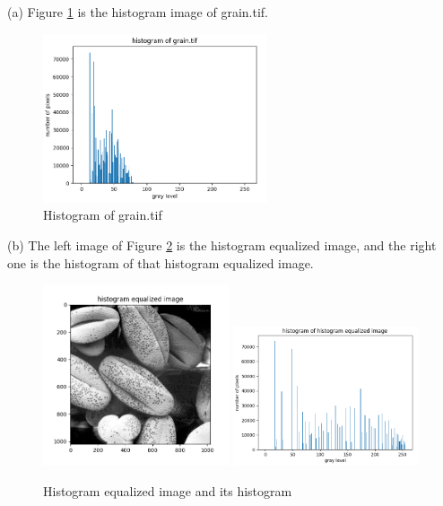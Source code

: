 \problem{}
(a) Figure \ref{fig:p1a} is the histogram image of grain.tif.\\

\begin{figure}[htbp]
    \centering
	\includegraphics[width=0.59\textwidth]{../images/p1/p1a_historgram_origin.png}
    \caption{Histogram of grain.tif}
    \label{fig:p1a}
\end{figure}

(b) The left image of Figure \ref{fig:p1b} is the histogram equalized image, and the right one is 
the histogram of that histogram equalized image.\\

\begin{figure}[htbp]
    \centering
	\includegraphics[width=0.49\textwidth]{../images/p1/p1b_hist_eq_image.png}
	\includegraphics[width=0.49\textwidth]{../images/p1/p1b_historgram_hist_eq.png}
    \caption{Histogram equalized image and its histogram}
    \label{fig:p1b}
\end{figure}

